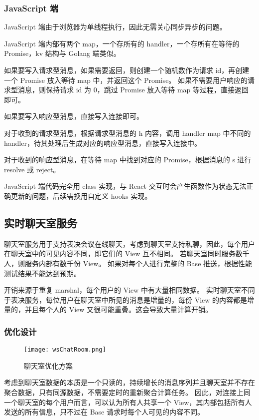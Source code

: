 \subsubsection{JavaScript 端}
JavaScript 端由于浏览器为单线程执行，因此无需关心同步异步的问题。

JavaScript 端内部有两个 map，一个存所有的 handler，一个存所有在等待的 Promise，kv 结构与 Golang 端类似。

如果要写入请求型消息，如果需要返回，则创建一个随机数作为请求 id，再创建一个 Promise 放入等待 map 中，并返回这个 Promise。
如果不需要用户响应的请求型消息，则保持请求 id 为 0，跳过 Promise 放入等待 map 等过程，直接返回即可。

如果要写入响应型消息，直接写入连接即可。

对于收到的请求型消息，根据请求型消息的 h 内容，调用 handler map 中不同的 handler，待其处理后生成对应的响应型消息，直接写入连接中。

对于收到的响应型消息，在等待 map 中找到对应的 Promise，根据消息的 s 进行 resolve 或 reject。

JavaScript 端代码完全用 class 实现，与 React 交互时会产生函数作为状态无法正确更新的问题，后续需换用自定义 hooks 实现。

\subsection{实时聊天室服务}
聊天室服务用于支持表决会议在线聊天，考虑到聊天室支持私聊，因此，每个用户在聊天室中的可见内容不同，即它们的 View 互不相同。
若聊天室同时服务数千人，则服务内部有数千份 View。
如果对每个人进行完整的 Base 推送，根据性能测试结果不能达到预期。

开销来源于重复 marshal，每个用户的 View 中有大量相同数据。
实时聊天室不同于表决服务，每位用户在聊天室中所见的消息是增量的，每份 View 的内容都是增量的，并且每个人的 View 又很可能重叠。这会导致大量计算开销。

\subsubsection{优化设计}
\begin{figure}[!htp]
  \centering
  \texttt{[image: wsChatRoom.png]}
  \caption{聊天室优化方案}
  \label{fig:wsChatRoom}
\end{figure}
考虑到聊天室数据的本质是一个只读的，持续增长的消息序列并且聊天室并不存在聚合数据，只有同源数据，不需要定时的重新聚合计算任务。
因此，对连接上同一个聊天室的每个用户而言，可以认为所有人共享一个 View，其内部包括所有人发送的所有信息，只不过在 Base 请求时每个人可见的内容不同。

